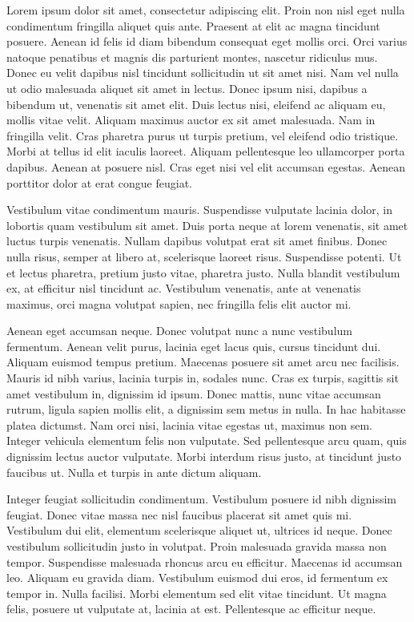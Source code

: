 Lorem ipsum dolor sit amet, consectetur adipiscing elit. Proin non nisl eget nulla condimentum fringilla aliquet quis ante. Praesent at elit ac magna tincidunt posuere. Aenean id felis id diam bibendum consequat eget mollis orci. Orci varius natoque penatibus et magnis dis parturient montes, nascetur ridiculus mus. Donec eu velit dapibus nisl tincidunt sollicitudin ut sit amet nisi. Nam vel nulla ut odio malesuada aliquet sit amet in lectus. Donec ipsum nisi, dapibus a bibendum ut, venenatis sit amet elit. Duis lectus nisi, eleifend ac aliquam eu, mollis vitae velit. Aliquam maximus auctor ex sit amet malesuada. Nam in fringilla velit. Cras pharetra purus ut turpis pretium, vel eleifend odio tristique. Morbi at tellus id elit iaculis laoreet. Aliquam pellentesque leo ullamcorper porta dapibus. Aenean at posuere nisl. Cras eget nisi vel elit accumsan egestas. Aenean porttitor dolor at erat congue feugiat.

Vestibulum vitae condimentum mauris. Suspendisse vulputate lacinia dolor, in lobortis quam vestibulum sit amet. Duis porta neque at lorem venenatis, sit amet luctus turpis venenatis. Nullam dapibus volutpat erat sit amet finibus. Donec nulla risus, semper at libero at, scelerisque laoreet risus. Suspendisse potenti. Ut et lectus pharetra, pretium justo vitae, pharetra justo. Nulla blandit vestibulum ex, at efficitur nisl tincidunt ac. Vestibulum venenatis, ante at venenatis maximus, orci magna volutpat sapien, nec fringilla felis elit auctor mi.

Aenean eget accumsan neque. Donec volutpat nunc a nunc vestibulum fermentum. Aenean velit purus, lacinia eget lacus quis, cursus tincidunt dui. Aliquam euismod tempus pretium. Maecenas posuere sit amet arcu nec facilisis. Mauris id nibh varius, lacinia turpis in, sodales nunc. Cras ex turpis, sagittis sit amet vestibulum in, dignissim id ipsum. Donec mattis, nunc vitae accumsan rutrum, ligula sapien mollis elit, a dignissim sem metus in nulla. In hac habitasse platea dictumst. Nam orci nisi, lacinia vitae egestas ut, maximus non sem. Integer vehicula elementum felis non vulputate. Sed pellentesque arcu quam, quis dignissim lectus auctor vulputate. Morbi interdum risus justo, at tincidunt justo faucibus ut. Nulla et turpis in ante dictum aliquam.

Integer feugiat sollicitudin condimentum. Vestibulum posuere id nibh dignissim feugiat. Donec vitae massa nec nisl faucibus placerat sit amet quis mi. Vestibulum dui elit, elementum scelerisque aliquet ut, ultrices id neque. Donec vestibulum sollicitudin justo in volutpat. Proin malesuada gravida massa non tempor. Suspendisse malesuada rhoncus arcu eu efficitur. Maecenas id accumsan leo. Aliquam eu gravida diam. Vestibulum euismod dui eros, id fermentum ex tempor in. Nulla facilisi. Morbi elementum sed elit vitae tincidunt. Ut magna felis, posuere ut vulputate at, lacinia at est. Pellentesque ac efficitur neque.

